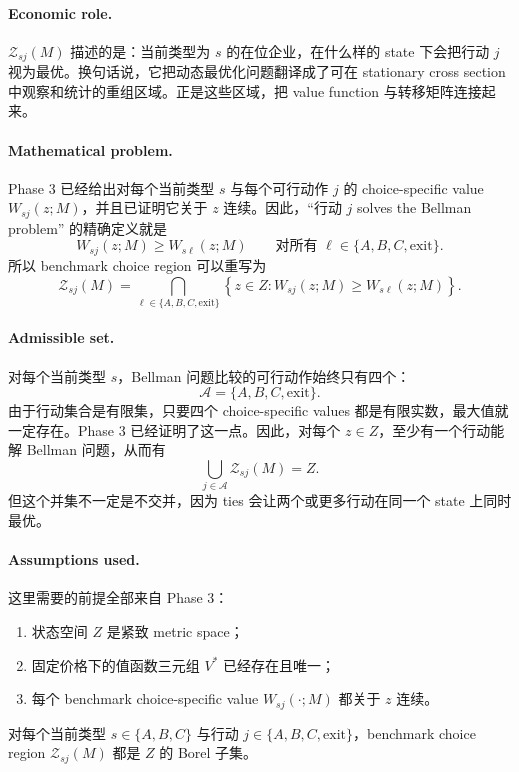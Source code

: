 \paragraph{Economic role.}
$\mathcal Z_{sj}(M)$ 描述的是：当前类型为 $s$ 的在位企业，在什么样的 state 下会把行动 $j$ 视为最优。换句话说，它把动态最优化问题翻译成了可在 stationary cross section 中观察和统计的重组区域。正是这些区域，把 value function 与转移矩阵连接起来。

\paragraph{Mathematical problem.}
Phase 3 已经给出对每个当前类型 $s$ 与每个可行动作 $j$ 的 choice-specific value $W_{sj}(z;M)$，并且已证明它关于 $z$ 连续。因此，“行动 $j$ solves the Bellman problem” 的精确定义就是
\[
W_{sj}(z;M)\ge W_{s\ell}(z;M)\qquad\text{对所有 }\ell\in\{A,B,C,\mathrm{exit}\}.
\]
所以 benchmark choice region 可以重写为
\[
\mathcal Z_{sj}(M)
=
\bigcap_{\ell\in\{A,B,C,\mathrm{exit}\}}
\left\{z\in Z:W_{sj}(z;M)\ge W_{s\ell}(z;M)\right\}.
\]

\paragraph{Admissible set.}
对每个当前类型 $s$，Bellman 问题比较的可行动作始终只有四个：
\[
\mathcal A=\{A,B,C,\mathrm{exit}\}.
\]
由于行动集合是有限集，只要四个 choice-specific values 都是有限实数，最大值就一定存在。Phase 3 已经证明了这一点。因此，对每个 $z\in Z$，至少有一个行动能解 Bellman 问题，从而有
\[
\bigcup_{j\in\mathcal A}\mathcal Z_{sj}(M)=Z.
\]
但这个并集不一定是不交并，因为 ties 会让两个或更多行动在同一个 state 上同时最优。

\paragraph{Assumptions used.}
这里需要的前提全部来自 Phase 3：
\begin{enumerate}
    \item 状态空间 $Z$ 是紧致 metric space；
    \item 固定价格下的值函数三元组 $V^*$ 已经存在且唯一；
    \item 每个 benchmark choice-specific value $W_{sj}(\cdot;M)$ 都关于 $z$ 连续。
\end{enumerate}

\begin{proposition}
对每个当前类型 $s\in\{A,B,C\}$ 与行动 $j\in\{A,B,C,\mathrm{exit}\}$，benchmark choice region $\mathcal Z_{sj}(M)$ 都是 $Z$ 的 Borel 子集。
\end{proposition}

